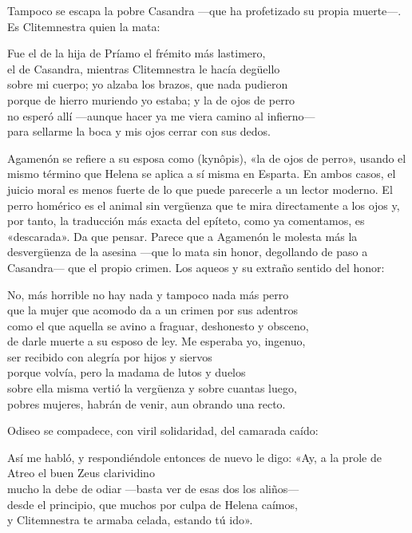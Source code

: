 Tampoco se escapa la pobre Casandra ---que ha profetizado su propia muerte---. Es Clitemnestra quien la mata:

\begin{versocita}
Fue el de la hija de Príamo el frémito más lastimero,\\
el de Casandra, mientras Clitemnestra le hacía degüello\\
sobre mi cuerpo; yo alzaba los brazos, que nada pudieron\\
porque de hierro muriendo yo estaba; y la de ojos de perro\\
no esperó allí ---aunque hacer ya me viera camino al infierno---\\
para sellarme la boca y mis ojos cerrar con sus dedos.
\end{versocita}

Agamenón se refiere a su esposa como  (kynôpis), «la de ojos de perro», usando el mismo término que Helena se aplica a sí misma en Esparta. En ambos casos, el juicio moral es menos fuerte de lo que puede parecerle a un lector moderno. El perro homérico es el animal sin vergüenza que te mira directamente a los ojos y, por tanto, la traducción más exacta del epíteto, como ya comentamos, es «descarada». Da que pensar. Parece que a Agamenón le molesta más la desvergüenza de la asesina ---que lo mata sin honor, degollando de paso a Casandra--- que el propio crimen. Los aqueos y su extraño sentido del honor:

\begin{versocita}
No, más horrible no hay nada y tampoco nada más perro\\
que la mujer que acomodo da a un crimen por sus adentros\\
como el que aquella se avino a fraguar, deshonesto y obsceno,\\
de darle muerte a su esposo de ley. Me esperaba yo, ingenuo,\\
ser recibido con alegría por hijos y siervos\\
porque volvía, pero la madama de lutos y duelos\\
sobre ella misma vertió la vergüenza y sobre cuantas luego,\\
pobres mujeres, habrán de venir, aun obrando una recto.
\end{versocita}

Odiseo se compadece, con viril solidaridad, del camarada caído:

\begin{versocita}
Así me habló, y respondiéndole entonces de nuevo le digo:
\stanzabreak
«Ay, a la prole de Atreo el buen Zeus clarividino\\
mucho la debe de odiar ---basta ver de esas dos los aliños---\\
desde el principio, que muchos por culpa de Helena caímos,\\
y Clitemnestra te armaba celada, estando tú ido».
\end{versocita}

